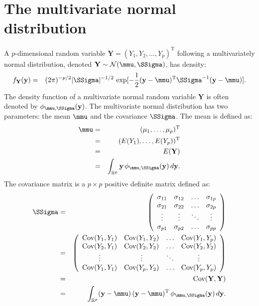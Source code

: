 \documentclass[a4paper]{article}
\theoremstyle{myexamplestyle}
\begin{document}
\section{The multivariate normal distribution}
A $p$-dimensional random variable $\mathbf{Y} = (Y_{1}, Y_2, \ldots,  Y_{p})^{\mathrm{T}}$ following a multivariately normal distribution, denoted $\mathbf{Y} \sim \mathcal{N}( \mmu, \SSigma)$, has density:
\begin{eqnarray*}
f_{\mathbf{Y}} (\mathbf{y}) & = &
(2 \pi)^{-p/2} | \SSigma |^{-1/2} \, \exp [ -\frac{1}{2} (\mathbf{y} - \mmu)^{\mathrm{T}} \SSigma^{-1} (\mathbf{y} - \mmu)].
\end{eqnarray*}
The density function of a multivariate normal random variable $\mathbf{Y}$ is often denoted by $\phi_{\mmu, \SSigma}(\mathbf{y})$. The multivariate normal distribution has two parameters: the mean $\mmu$ and the covariance $\SSigma$. The mean is defined as:
\begin{eqnarray*}
\mmu & = & (\mu_1, \ldots, \mu_p)^{\mathrm{T}}
\\
& = & (E(Y_1), \ldots, E(Y_p))^{\mathrm{T}}
\\
& = & E(\mathbf{Y})
\\
& = & \int_{\mathbb{R}^p} \mathbf{y} \, \phi_{\mmu, \SSigma}(\mathbf{y}) \, d \mathbf{y}.
\end{eqnarray*}
The covariance matrix is a $p \times p$ positive definite matrix defined as:
\begin{eqnarray*}
\SSigma
& = &
\left(
\begin{array}{cccc}
\sigma_{11} & \sigma_{12} & \ldots & \sigma_{1p}
\\
\sigma_{21} & \sigma_{22} & \ldots & \sigma_{2p}
\\
\vdots & \vdots & \ddots & \vdots
\\
\sigma_{p1} & \sigma_{p2} & \ldots & \sigma_{pp}
\end{array}
\right)
\\
& = &
\left(
\begin{array}{cccc}
\mbox{Cov}(Y_1, Y_1) & \mbox{Cov}(Y_1, Y_2) & \ldots & \mbox{Cov}(Y_1, Y_p)
\\
\mbox{Cov}(Y_2, Y_1) & \mbox{Cov}(Y_2, Y_2) & \ldots & \mbox{Cov}(Y_2, Y_2)
\\
\vdots & \vdots & \ddots & \vdots
\\
\mbox{Cov}(Y_1, Y_1) & \mbox{Cov}(Y_p, Y_2) & \ldots & \mbox{Cov}(Y_p, Y_p)
\end{array}
\right)
\\
& = & \mbox{Cov}(\mathbf{Y}, \mathbf{Y})
\\
& = & \int_{\mathbb{R}^p} (\mathbf{y} - \mmu) \, (\mathbf{y} - \mmu)^{\mathrm{T}} \, \phi_{\mmu, \SSigma}(\mathbf{y}) \, d \mathbf{y}.
\end{eqnarray*}
\end{document}
